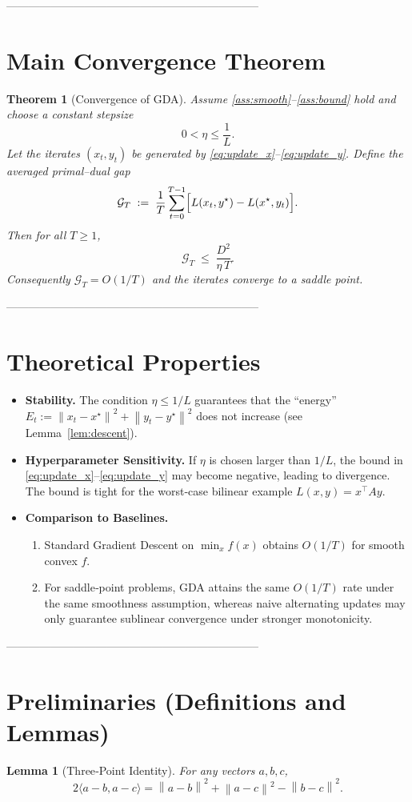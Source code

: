 \documentclass{article}
\newtheorem{theorem}{Theorem}
\newtheorem{lemma}{Lemma}
\newcommand{\norm}[1]{\left\lVert#1\right\rVert}
\begin{document}
--------------------------------------------------------------------
\section*{Main Convergence Theorem}
\begin{theorem}[Convergence of GDA]\label{thm:convergence}
Assume \ref{ass:smooth}–\ref{ass:bound} hold and choose a constant stepsize
\[
0<\eta\le \frac{1}{L}.
\]
Let the iterates $(x_t,y_t)$ be generated by \eqref{eq:update_x}–\eqref{eq:update_y}.
Define the averaged primal–dual gap
\[
\mathcal{G}_T \;:=\; \frac{1}{T}\sum_{t=0}^{T-1}
\Bigl[ L(x_t,y^\star)-L(x^\star,y_t) \Bigr].
\]
Then for all $T\ge1$,
\[
\mathcal{G}_T \;\le\; \frac{D^2}{\eta\,T}.
\tag{1}
\]
Consequently $\mathcal{G}_T=O(1/T)$ and the iterates converge to a saddle point.
\end{theorem}

--------------------------------------------------------------------
\section*{Theoretical Properties}
\begin{itemize}[leftmargin=*]
\item \textbf{Stability.} The condition $\eta\le 1/L$ guarantees that the
   ``energy'' $E_t:=\norm{x_t-x^\star}^2+\norm{y_t-y^\star}^2$ does not increase
   (see Lemma~\ref{lem:descent}).
\item \textbf{Hyperparameter Sensitivity.} If $\eta$ is chosen larger than $1/L$, the
   bound in \eqref{eq:update_x}–\eqref{eq:update_y} may become negative,
   leading to divergence. The bound is tight for the worst‑case
   bilinear example $L(x,y)=x^\top A y$.
\item \textbf{Comparison to Baselines.}
   \begin{enumerate}
   \item Standard Gradient Descent on $\min_{x} f(x)$ obtains $O(1/T)$ for
         smooth convex $f$.
   \item For saddle‑point problems, GDA attains the same $O(1/T)$ rate
         under the same smoothness assumption, whereas naive alternating
         updates may only guarantee sublinear convergence under stronger
         monotonicity.
   \end{enumerate}
\end{itemize}

--------------------------------------------------------------------
\section*{Preliminaries (Definitions and Lemmas)}
\begin{lemma}[Three‑Point Identity]\label{lem:three}
For any vectors $a,b,c$,
\[
2\langle a-b, a-c\rangle = \norm{a-b}^2+\norm{a-c}^2-\norm{b-c}^2 .
\]
\end{lemma}
\end{document}
